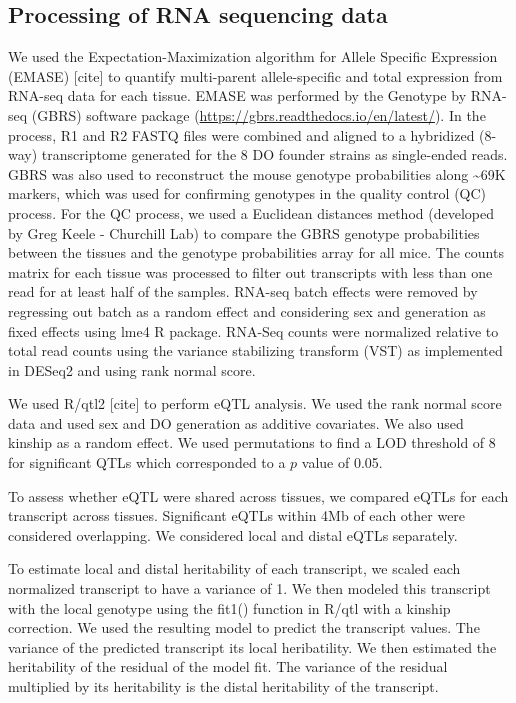 \documentclass[
]{article}
\begin{document}
\subsection{Processing of RNA sequencing
data}\label{processing-of-rna-sequencing-data}

We used the Expectation-Maximization algorithm for Allele Specific
Expression (EMASE) {[}cite{]} to quantify multi-parent allele-specific
and total expression from RNA-seq data for each tissue. EMASE was
performed by the Genotype by RNA-seq (GBRS) software package
(\url{https://gbrs.readthedocs.io/en/latest/}). In the process, R1 and
R2 FASTQ files were combined and aligned to a hybridized (8-way)
transcriptome generated for the 8 DO founder strains as single-ended
reads. GBRS was also used to reconstruct the mouse genotype
probabilities along \textasciitilde69K markers, which was used for
confirming genotypes in the quality control (QC) process. For the QC
process, we used a Euclidean distances method (developed by Greg Keele -
Churchill Lab) to compare the GBRS genotype probabilities between the
tissues and the genotype probabilities array for all mice. The counts
matrix for each tissue was processed to filter out transcripts with less
than one read for at least half of the samples. RNA-seq batch effects
were removed by regressing out batch as a random effect and considering
sex and generation as fixed effects using lme4 R package. RNA-Seq counts
were normalized relative to total read counts using the variance
stabilizing transform (VST) as implemented in DESeq2 and using rank
normal score.

We used R/qtl2 {[}cite{]} to perform eQTL analysis. We used the rank
normal score data and used sex and DO generation as additive covariates.
We also used kinship as a random effect. We used permutations to find a
LOD threshold of 8 for significant QTLs which corresponded to a \(p\)
value of 0.05.

To assess whether eQTL were shared across tissues, we compared eQTLs for
each transcript across tissues. Significant eQTLs within 4Mb of each
other were considered overlapping. We considered local and distal eQTLs
separately.

To estimate local and distal heritability of each transcript, we scaled
each normalized transcript to have a variance of 1. We then modeled this
transcript with the local genotype using the fit1() function in R/qtl
with a kinship correction. We used the resulting model to predict the
transcript values. The variance of the predicted transcript its local
heribatility. We then estimated the heritability of the residual of the
model fit. The variance of the residual multiplied by its heritability
is the distal heritability of the transcript.
\end{document}
